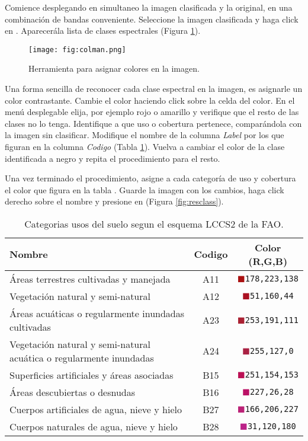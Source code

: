Comience desplegando en simultaneo la imagen clasificada y la original, en una combinación de bandas conveniente. Seleccione la imagen clasificada y haga click en . Aparecerála lista de clases espectrales (Figura \ref{fig:colman}).

\begin{figure}[h!]
    \centering
    \texttt{[image: fig:colman.png]}
    \caption{Herramienta para asignar colores en la imagen.}
    \label{fig:colman}
\end{figure}

Una forma sencilla de reconocer cada clase espectral en la imagen, es asignarle un color contrastante. Cambie el color haciendo click sobre la celda del color. En el menú desplegable elija, por ejemplo rojo o amarillo y verifique que el resto de las clases no lo tenga. Identifique a que uso o cobertura pertenece, comparándola con la imagen sin clasificar. Modifique el nombre de la columna \emph{Label} por los que figuran en la columna \emph{Codigo} (Tabla \ref{tab:usos}). Vuelva a cambiar el color de la clase identificada a negro y repita el procedimiento para el resto.

Una vez terminado el procedimiento, asigne a cada categoría de uso y cobertura el color que figura en la tabla . Guarde la imagen con los cambios, haga click derecho sobre el nombre y presione en  (Figura \ref{fig:resclass}).

\begin{table}[hbt]
    \centering
    \begin{tabular}{p{11cm}cc}
        \toprule
        Nombre & Codigo & Color (R,G,B) \\
        \midrule
        Áreas terrestres cultivadas y manejada & A11 & \textcolor{A11}{$\blacksquare$}\texttt{178,223,138}
        \\
        Vegetación natural y semi-natural & A12 & \textcolor{A12}{$\blacksquare$}\texttt{51,160,44}\\
        Áreas acuáticas o regularmente inundadas cultivadas & A23  &
        \textcolor{A23}{$\blacksquare$}\texttt{253,191,111}\\
        Vegetación natural y semi-natural acuática o
	regularmente inundadas & A24 & \textcolor{A24}{$\blacksquare$}\texttt{255,127,0}\\
        Superficies artificiales y áreas asociadas & B15  &
        \textcolor{B15}{$\blacksquare$}\texttt{251,154,153}\\
        Áreas descubiertas o desnudas & B16 & \textcolor{B16}{$\blacksquare$}\texttt{227,26,28}\\
        Cuerpos artificiales de agua, nieve y hielo & B27 &
        \textcolor{B27}{$\blacksquare$}\texttt{166,206,227}\\
        Cuerpos naturales de agua, nieve y hielo & B28&
        \textcolor{B28}{$\blacksquare$}\texttt{31,120,180}\\
        \bottomrule
    \end{tabular}
\caption{\label{tab:usos}Categorias usos del suelo segun el esquema LCCS2 de la FAO.}
\end{table}

